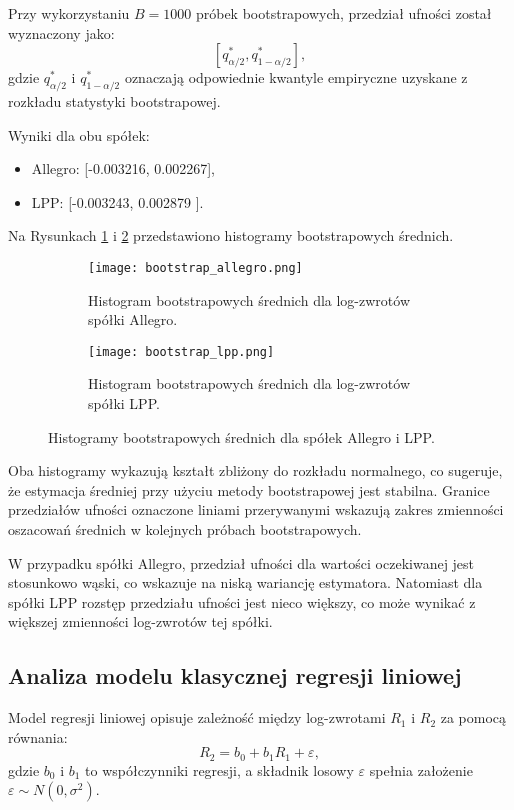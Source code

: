\documentclass[12pt]{article}
\begin{document}
Przy wykorzystaniu $B = 1000$ próbek bootstrapowych, przedział ufności został wyznaczony jako:
\[
\left[q^*_{\alpha/2}, q^*_{1-\alpha/2}\right],
\]
gdzie $q^*_{\alpha/2}$ i $q^*_{1-\alpha/2}$ oznaczają odpowiednie kwantyle empiryczne uzyskane z rozkładu statystyki bootstrapowej.  


Wyniki dla obu spółek:
\begin{itemize}
    \item Allegro: [-0.003216, 0.002267],
    \item LPP: [-0.003243, 0.002879 ].
\end{itemize}
Na Rysunkach \ref{fig:bootstrap-allegro} i \ref{fig:bootstrap-lpp} przedstawiono histogramy bootstrapowych średnich.

\begin{figure}[H]
    \centering
    \begin{subfigure}[t]{0.45\textwidth}
        \centering
        \texttt{[image: bootstrap\_allegro.png]}
        \caption{Histogram bootstrapowych średnich dla log-zwrotów spółki Allegro.}
        \label{fig:bootstrap-allegro}
    \end{subfigure}
    \hfill
    \begin{subfigure}[t]{0.45\textwidth}
        \centering
        \texttt{[image: bootstrap\_lpp.png]}
        \caption{Histogram bootstrapowych średnich dla log-zwrotów spółki LPP.}
        \label{fig:bootstrap-lpp}
    \end{subfigure}
    \caption{Histogramy bootstrapowych średnich dla spółek Allegro i LPP.}
    \label{fig:bootstrap-histograms}
\end{figure}

Oba histogramy wykazują kształt zbliżony do rozkładu normalnego, co sugeruje, że estymacja średniej przy użyciu metody bootstrapowej jest stabilna. Granice przedziałów ufności oznaczone liniami przerywanymi wskazują zakres zmienności oszacowań średnich w kolejnych próbach bootstrapowych.

W przypadku spółki Allegro, przedział ufności dla wartości oczekiwanej jest stosunkowo wąski, co wskazuje na niską wariancję estymatora. Natomiast dla spółki LPP rozstęp przedziału ufności jest nieco większy, co może wynikać z większej zmienności log-zwrotów tej spółki.


\subsection{Analiza modelu klasycznej regresji liniowej}
Model regresji liniowej opisuje zależność między log-zwrotami \(R_1\) i \(R_2\) za pomocą równania:
\[
R_2 = b_0 + b_1 R_1 + \varepsilon,
\]
gdzie \(b_0\) i \(b_1\) to współczynniki regresji, a składnik losowy \(\varepsilon\) spełnia założenie \(\varepsilon \sim N(0, \sigma^2)\).
\end{document}
